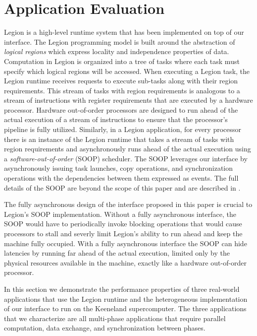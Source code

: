 
\section{Application Evaluation}
\label{sec:apps}
Legion is a high-level runtime system that has been implemented on top
of our interface\cite{Legion12}.  
The Legion programming model is built around the abstraction of 
{\em logical regions} which express locality and independence properties 
of data.  Computation in Legion is organized into a tree of tasks where 
each task must specify which logical regions will be accessed.
When executing a Legion task, the Legion runtime receives requests
to execute sub-tasks along with their region requirements.
This stream of tasks with region requirements is analogous to a stream
of instructions with register requirements that are executed by 
a hardware processor.  Hardware out-of-order processors are designed to
run ahead of the actual execution of a stream of instructions
to ensure that the processor's pipeline is fully utilized.  Similarly, in a
Legion application, for every processor there is an instance of the Legion runtime
that takes a stream of tasks with region requirements and asynchronously
runs ahead of the actual execution using a {\em software-out-of-order} (SOOP)
scheduler.  The SOOP leverages our interface by asynchronously issuing task launches, copy
operations, and synchronization operations with the dependencies between them expressed
as events.  The full details of the SOOP are beyond the scope of this paper
and are described in \cite{Legion12}.

The fully asynchronous design of the interface proposed in
this paper is crucial to Legion's SOOP implementation.  Without a fully
asynchronous interface, the SOOP would have to periodically invoke
blocking operations that would cause processors to stall and severly
limit Legion's ability to run ahead and keep the machine fully
occupied.  With a fully asynchronous interface the SOOP can hide latencies by 
running
far ahead of the actual execution, limited only by the physical resources
available in the machine, exactly like a hardware out-of-order processor.

In this section we demonstrate the performance properties of three
real-world applications that use the Legion runtime and the heterogeneous
implementation of our interface to run on the Keeneland supercomputer.
The three applications that we characterize are all multi-phase
applications that require parallel computation, data exchange, and
synchronization between phases. 


